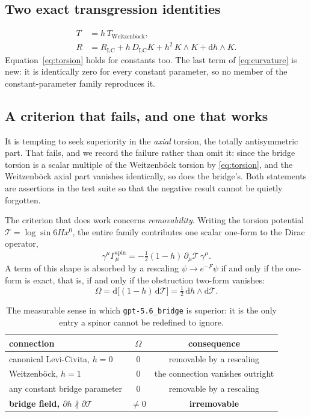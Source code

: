 \documentclass[11pt]{article}
\newcommand{\dd}{\mathrm{d}}
\begin{document}
\subsection{Two exact transgression identities}

\begin{align}
  T &= h\,T_{\mathrm{Weitzenb\ddot{o}ck}},
  \label{eq:torsion}\\
  R &= R_{\mathrm{LC}} + h\,D_{\mathrm{LC}}K + h^2\,K\wedge K
      + \dd h\wedge K .
  \label{eq:curvature}
\end{align}
Equation~\eqref{eq:torsion} holds for constants too. The last term of
\eqref{eq:curvature} is new: it is identically zero for every constant
parameter, so no member of the constant-parameter family reproduces it.

\subsection{A criterion that fails, and one that works}

It is tempting to seek superiority in the \emph{axial} torsion, the totally
antisymmetric part. That fails, and we record the failure rather than omit it:
since the bridge torsion is a scalar multiple of the Weitzenb\"ock torsion by
\eqref{eq:torsion}, and the Weitzenb\"ock axial part vanishes identically, so
does the bridge's. Both statements are assertions in the test suite so that the
negative result cannot be quietly forgotten.

The criterion that does work concerns \emph{removability}. Writing the torsion
potential $\mathcal T=\log\sin 6Hx^0$, the entire family contributes one scalar
one-form to the Dirac operator,
\begin{equation}
  \gamma^\mu\Gamma^{\mathrm{spin}}_\mu
  = -\tfrac12(1-h)\,\partial_\mu\mathcal T\,\gamma^\mu .
\end{equation}
A term of this shape is absorbed by a rescaling $\psi\to e^{-F}\psi$ if and only
if the one-form is exact, that is, if and only if the obstruction two-form
vanishes:
\begin{equation}
  \Omega = \dd\bigl[(1-h)\,\dd\mathcal T\bigr]
         = \tfrac12\,\dd h\wedge\dd\mathcal T .
\end{equation}

\begin{table}[htbp]
\centering
\begin{tabular}{lcc}
\toprule
connection & $\Omega$ & consequence \\
\midrule
canonical Levi-Civita, $h=0$ & $0$ & removable by a rescaling \\
Weitzenb\"ock, $h=1$ & $0$ & the connection vanishes outright \\
any constant bridge parameter & $0$ & removable by a rescaling \\
\textbf{bridge field, $\partial h \not\parallel \partial\mathcal T$} & $\neq0$ & \textbf{irremovable} \\
\bottomrule
\end{tabular}
\caption{The measurable sense in which \texttt{gpt-5.6\_bridge} is superior: it
is the only entry a spinor cannot be redefined to ignore.}
\end{table}
\end{document}
